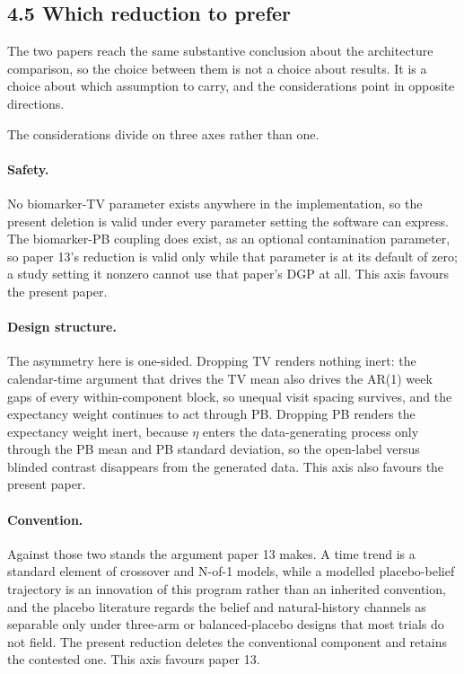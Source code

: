 \documentclass[
  11pt,
]{article}
\begin{document}
\subsection{4.5 Which reduction to prefer}

The two papers reach the same substantive conclusion about the
architecture comparison, so the choice between them is not a choice
about results. It is a choice about which assumption to carry, and
the considerations point in opposite directions.

The considerations divide on three axes rather than one.

\paragraph{Safety.}

No biomarker-TV parameter exists anywhere in the
implementation, so the present deletion is valid under every
parameter setting the software can express. The biomarker-PB coupling
does exist, as an optional contamination parameter, so paper 13's
reduction is valid only while that parameter is at its default of
zero; a study setting it nonzero cannot use that paper's DGP at all.
This axis favours the present paper.

\paragraph{Design structure.}

The asymmetry here is one-sided.
Dropping TV renders nothing inert: the calendar-time argument that
drives the TV mean also drives the AR(1) week gaps of every
within-component block, so unequal visit spacing survives, and the
expectancy weight continues to act through PB. Dropping PB renders
the expectancy weight inert, because \(\eta\) enters the
data-generating process only through the PB mean and PB standard
deviation, so the open-label versus blinded contrast disappears from
the generated data. This axis also favours the present paper.

\paragraph{Convention.}

Against those two stands the argument paper
13 makes. A time trend is a standard element of crossover and N-of-1
models, while a modelled placebo-belief trajectory is an innovation
of this program rather than an inherited convention, and the placebo
literature regards the belief and natural-history channels as
separable only under three-arm or balanced-placebo designs that most
trials do not field. The present reduction deletes the conventional
component and retains the contested one. This axis favours paper 13.
\end{document}
